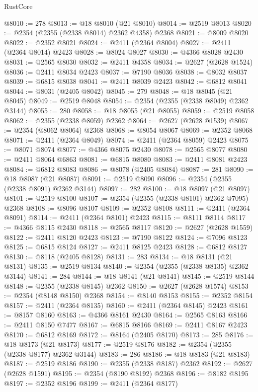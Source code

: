 \begin{lexlean}{RustCore}
\begin{coremodule}
@8010 := 278
@8013 := @18 @8010 (@21 @8010)
@8014 := @2519 @8013
@8020 := @2354 (@2355 (@2338 @8014) @2362 @4358) @2368
@8021 := @8009 @8020
@8022 := @2352 @8021
@8024 := @2411 (@2364 @8004)
@8027 := @2411 (@2364 @8014) @2423
@8028 := @8024 @8027
@8030 := @4366 @8028 @2430
@8031 := @2565 @8030
@8032 := @2411 @4358
@8034 := @2627 (@2628 @1524)
@8036 := @2411 @8034 @2423
@8037 := @7190 @8036
@8038 := @8032 @8037
@8039 := @6815 @8038
@8041 := @2411 @8039 @2423
@8042 := @6812 @8041
@8044 := @8031 (@2405 @8042)
@8045 := 279
@8048 := @18 @8045 (@21 @8045)
@8049 := @2519 @8048
@8054 := @2354 (@2355 (@2338 @8049) @2362 @3144)
@8055 := 280
@8058 := @18 @8055 (@21 @8055)
@8059 := @2519 @8058
@8062 := @2355 (@2338 @8059) @2362
@8064 := @2627 (@2628 @1539)
@8067 := @2354 (@8062 @8064) @2368
@8068 := @8054 @8067
@8069 := @2352 @8068
@8071 := @2411 (@2364 @8049)
@8074 := @2411 (@2364 @8059) @2423
@8075 := @8071 @8074
@8077 := @4366 @8075 @2430
@8078 := @2565 @8077
@8080 := @2411 @8064 @6863
@8081 := @6815 @8080
@8083 := @2411 @8081 @2423
@8084 := @6812 @8083
@8086 := @8078 (@2405 @8084)
@8087 := 281
@8090 := @18 @8087 (@21 @8087)
@8091 := @2519 @8090
@8096 := @2354 (@2355 (@2338 @8091) @2362 @3144)
@8097 := 282
@8100 := @18 @8097 (@21 @8097)
@8101 := @2519 @8100
@8107 := @2354 (@2355 (@2338 @8101) @2362 @7095) @2368
@8108 := @8096 @8107
@8109 := @2352 @8108
@8111 := @2411 (@2364 @8091)
@8114 := @2411 (@2364 @8101) @2423
@8115 := @8111 @8114
@8117 := @4366 @8115 @2430
@8118 := @2565 @8117
@8120 := @2627 (@2628 @1559)
@8122 := @2411 @8120 @2423
@8123 := @7190 @8122
@8124 := @7096 @8123
@8125 := @6815 @8124
@8127 := @2411 @8125 @2423
@8128 := @6812 @8127
@8130 := @8118 (@2405 @8128)
@8131 := 283
@8134 := @18 @8131 (@21 @8131)
@8135 := @2519 @8134
@8140 := @2354 (@2355 (@2338 @8135) @2362 @3144)
@8141 := 284
@8144 := @18 @8141 (@21 @8141)
@8145 := @2519 @8144
@8148 := @2355 (@2338 @8145) @2362
@8150 := @2627 (@2628 @1574)
@8153 := @2354 (@8148 @8150) @2368
@8154 := @8140 @8153
@8155 := @2352 @8154
@8157 := @2411 (@2364 @8135)
@8160 := @2411 (@2364 @8145) @2423
@8161 := @8157 @8160
@8163 := @4366 @8161 @2430
@8164 := @2565 @8163
@8166 := @2411 @8150 @7477
@8167 := @6815 @8166
@8169 := @2411 @8167 @2423
@8170 := @6812 @8169
@8172 := @8164 (@2405 @8170)
@8173 := 285
@8176 := @18 @8173 (@21 @8173)
@8177 := @2519 @8176
@8182 := @2354 (@2355 (@2338 @8177) @2362 @3144)
@8183 := 286
@8186 := @18 @8183 (@21 @8183)
@8187 := @2519 @8186
@8190 := @2355 (@2338 @8187) @2362
@8192 := @2627 (@2628 @1591)
@8195 := @2354 (@8190 @8192) @2368
@8196 := @8182 @8195
@8197 := @2352 @8196
@8199 := @2411 (@2364 @8177)

\end{coremodule}
\end{lexlean}
